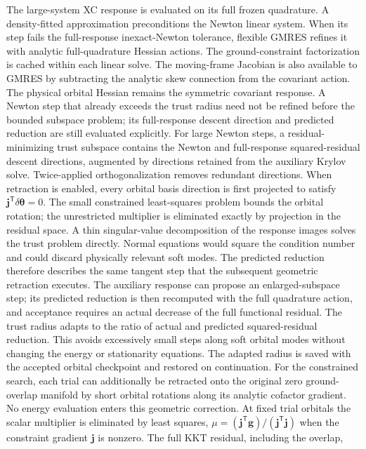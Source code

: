 The large-system XC response is evaluated on its full frozen quadrature.
A density-fitted approximation preconditions the Newton linear system.
When its step fails the full-response inexact-Newton tolerance, flexible
GMRES refines it with analytic full-quadrature Hessian actions. The
ground-constraint factorization is cached within each linear solve.
The moving-frame Jacobian is also available to GMRES by subtracting the
analytic skew connection from the covariant action. The physical orbital
Hessian remains the symmetric covariant response. A Newton step that
already exceeds the trust radius need not be refined before the bounded
subspace problem; its full-response descent direction and predicted
reduction are still evaluated explicitly. For
large Newton steps, a residual-minimizing trust subspace contains the
Newton and full-response squared-residual descent directions, augmented
by directions retained from the auxiliary Krylov solve. Twice-applied
orthogonalization removes redundant directions. When retraction is enabled, every orbital basis direction is first
projected to satisfy $\mathbf j^{\mathsf T}\delta\boldsymbol\theta=0$.
The small constrained least-squares problem bounds the orbital rotation;
the unrestricted multiplier is eliminated exactly by projection in the
residual space. A thin singular-value decomposition of the response
images solves the trust problem directly. Normal equations would square
the condition number and could discard physically relevant soft modes.
The predicted reduction therefore describes the same tangent step that
the subsequent geometric retraction executes. The auxiliary response can
propose an enlarged-subspace step; its predicted reduction is then
recomputed with the full quadrature action, and acceptance requires an
actual decrease of the full functional residual. The trust radius adapts
to the ratio of actual and predicted squared-residual reduction. This
avoids excessively small steps along soft orbital modes without changing
the energy or stationarity equations. The adapted radius is saved with
the accepted orbital checkpoint and restored on continuation.
For the constrained search, each trial can additionally be retracted onto
the original zero ground-overlap manifold by short orbital rotations
along its analytic cofactor gradient. No energy evaluation enters this
geometric correction. At fixed trial orbitals the scalar multiplier is
eliminated by least squares, $\mu=(\mathbf j^{\mathsf T}\mathbf g)/
(\mathbf j^{\mathsf T}\mathbf j)$ when the constraint gradient
$\mathbf j$ is nonzero. The full KKT residual, including the overlap,
